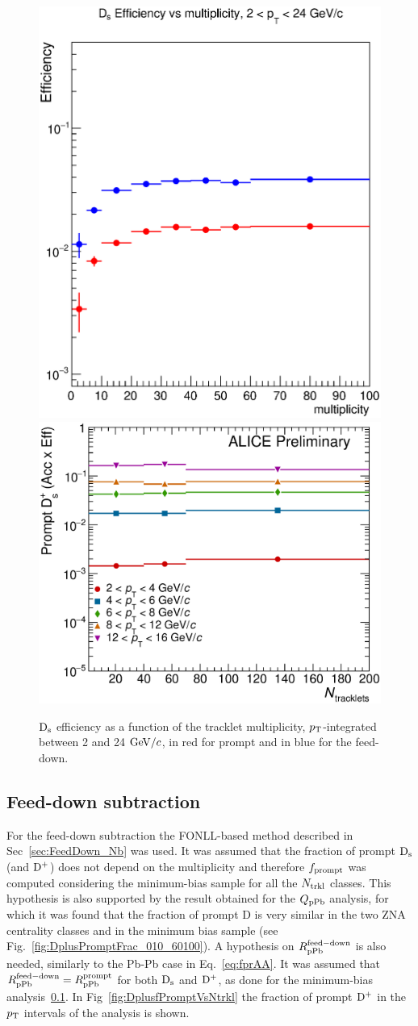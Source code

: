 \begin{figure}[h]
\centering
 \includegraphics[width=.45\textwidth]{FigCap6/DsEffvsMult_pPb2016.eps}
 \includegraphics[width=.45\textwidth]{FigCap6/PromptDsEfficiency_times_Acceptance_VsNtrkl.eps}
 \caption{${\rm D_s}$ efficiency as a function of the tracklet multiplicity, $p_{\rm T}$-integrated between 2 and 24 $\mathrm{GeV}/c$, in red for prompt and in blue for the feed-down.}
 \label{fig:DsEffVsMult}
\end{figure}



\subsection {Feed-down subtraction}
For the feed-down subtraction the FONLL-based method 
described in Sec~\ref{sec:FeedDown_Nb} was used. It was 
assumed that the fraction of prompt ${\rm D_s}$ (and ${\rm D^+}$) does not depend on the 
multiplicity and therefore $f_{\rm prompt}$ was computed considering 
the minimum-bias sample for all the $N_{\rm trkl}$ classes. This hypothesis 
is also supported by the result obtained for the $Q_{\rm pPb}$ analysis, 
for which it was found that the fraction of prompt D is very similar 
in the two ZNA centrality classes and in the minimum bias sample 
(see Fig.~\ref{fig:DplusPromptFrac_010_60100}). A hypothesis on 
$R_{\rm pPb}^{\rm feed-down}$ is also needed, similarly to the Pb-Pb case in Eq.~\ref{eq:fprAA}.
It was assumed that $R_{\rm pPb}^{\rm feed-down} = R_{\rm pPb}^{\rm prompt}$ 
for both ${\rm D_s}$ and ${\rm D^+}$, as done for the minimum-bias analysis~\ref{}. 
In Fig~\ref{fig:DplusfPromptVsNtrkl} the fraction of prompt ${\rm D^+}$ in the $p_{\rm T}$ intervals of the analysis is shown.


